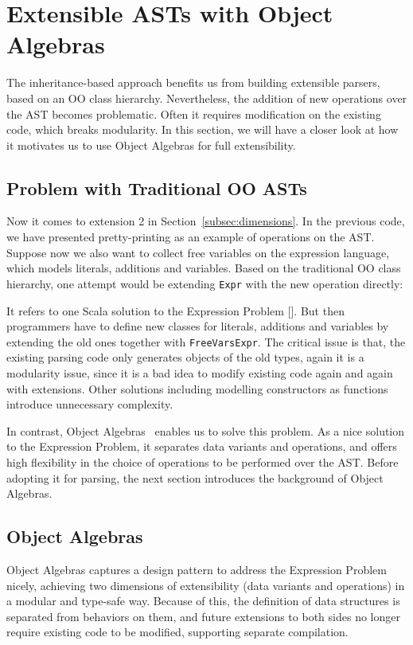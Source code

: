 \section{Extensible ASTs with Object Algebras}\label{sec:algebrasandparsing}

The inheritance-based approach benefits us from building extensible parsers, based on an OO class hierarchy.
Nevertheless, the addition of new operations over the AST becomes problematic. Often it requires modification on
the existing code, which breaks modularity. In this section, we will have a closer look at how it motivates us to
use Object Algebras for full extensibility.

\subsection{Problem with Traditional OO ASTs}\label{subsec:problemwithoutoa}

Now it comes to extension 2 in Section~\ref{subsec:dimensions}. In the previous code, we have presented pretty-printing as
an example of operations on the AST. Suppose now we also want to collect free variables on the expression language, which models
literals, additions and variables. Based on the traditional OO class hierarchy, one attempt would be extending \lstinline{Expr} with the new
operation directly:

It refers to one Scala solution to the Expression Problem []. But then programmers have to define new classes for literals, additions and variables
by extending the old ones together with \lstinline{FreeVarsExpr}. The critical issue is that, the existing parsing code only generates objects of the old
types, again it is a modularity issue, since it is a bad idea to modify existing code again and again with extensions. Other solutions including modelling constructors as functions introduce unnecessary complexity.

In contrast, Object Algebras~\cite{Oliveira2012} enables us to solve this problem. As a nice solution to the Expression Problem, it separates data variants
and operations, and offers high flexibility in the choice of operations to be performed over the AST. Before adopting it for parsing, the next section introduces the background of Object Algebras.

\subsection{Object Algebras}\label{subsec:objectalgebras}
Object Algebras captures a design pattern to address the Expression Problem nicely,
achieving two dimensions of extensibility (data variants and operations) in a modular and type-safe way.
Because of this, the definition of data structures is separated from behaviors on them, and future extensions
to both sides no longer require existing code to be modified, supporting separate compilation.

